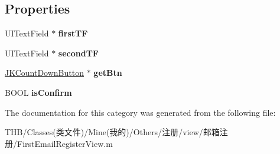 \subsection*{Properties}
\begin{DoxyCompactItemize}
\item 
\mbox{\label{category_first_email_register_view_07_08_a0d228201522780210eddd0620af73ae0}} 
U\+I\+Text\+Field $\ast$ {\bfseries first\+TF}
\item 
\mbox{\label{category_first_email_register_view_07_08_ab0c402400cd7e7b277614bcbe73d95cd}} 
U\+I\+Text\+Field $\ast$ {\bfseries second\+TF}
\item 
\mbox{\label{category_first_email_register_view_07_08_af922f0c2f824670490686c98881141e5}} 
\mbox{\hyperlink{interface_j_k_count_down_button}{J\+K\+Count\+Down\+Button}} $\ast$ {\bfseries get\+Btn}
\item 
\mbox{\label{category_first_email_register_view_07_08_aeb727bb2fabac6876b91f02e54e34497}} 
B\+O\+OL {\bfseries is\+Confirm}
\end{DoxyCompactItemize}


The documentation for this category was generated from the following file\+:\begin{DoxyCompactItemize}
\item 
T\+H\+B/\+Classes(类文件)/\+Mine(我的)/\+Others/注册/view/邮箱注册/First\+Email\+Register\+View.\+m\end{DoxyCompactItemize}

